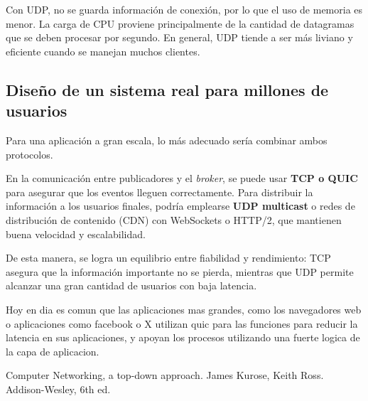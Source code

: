 \documentclass[10pt]{article}
\begin{document}
Con UDP, no se guarda información de conexión, por lo que el uso de memoria es menor. La carga de CPU proviene principalmente de la cantidad de datagramas que se deben procesar por segundo. En general, UDP tiende a ser más liviano y eficiente cuando se manejan muchos clientes.


\subsection{Diseño de un sistema real para millones de usuarios}
Para una aplicación a gran escala, lo más adecuado sería combinar ambos protocolos. 

En la comunicación entre publicadores y el \textit{broker}, se puede usar \textbf{TCP o QUIC} para asegurar que los eventos lleguen correctamente. Para distribuir la información a los usuarios finales, podría emplearse \textbf{UDP multicast} o redes de distribución de contenido (CDN) con WebSockets o HTTP/2, que mantienen buena velocidad y escalabilidad.

De esta manera, se logra un equilibrio entre fiabilidad y rendimiento: TCP asegura que la información importante no se pierda, mientras que UDP permite alcanzar una gran cantidad de usuarios con baja latencia. 

Hoy en dia es comun que las aplicaciones mas grandes, como los navegadores web o aplicaciones como facebook o X utilizan quic para las funciones para reducir la latencia en sus aplicaciones, y apoyan los procesos utilizando una fuerte logica de la capa de aplicacion.


\begin{thebibliography}{9}


  Computer Networking, a top-down approach. James Kurose, Keith Ross. Addison-Wesley, 6th ed.

  \end{thebibliography}
\end{document}
